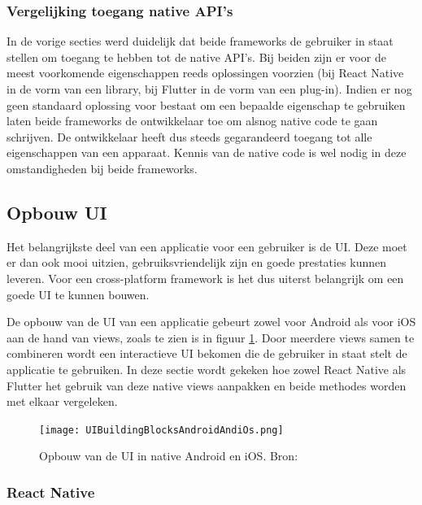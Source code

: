 \subsubsection{Vergelijking toegang native API's}
\label{subsubsec:vglToegangNativeAPIs}

In de vorige secties werd duidelijk dat beide frameworks de gebruiker in staat stellen om toegang te hebben tot de native API's. Bij beiden zijn er voor de meest voorkomende eigenschappen reeds oplossingen voorzien (bij React Native in de vorm van een library, bij Flutter in de vorm van een plug-in). Indien er nog geen standaard oplossing voor bestaat om een bepaalde eigenschap te gebruiken laten beide frameworks de ontwikkelaar toe om alsnog native code te gaan schrijven. De ontwikkelaar heeft dus steeds gegarandeerd toegang tot alle eigenschappen van een apparaat. Kennis van de native code is wel nodig in deze omstandigheden bij beide frameworks.


\subsection{Opbouw UI}
\label{subsec:opbouwUI}

Het belangrijkste deel van een applicatie voor een gebruiker is de UI. Deze moet er dan ook mooi uitzien, gebruiksvriendelijk zijn en goede prestaties kunnen leveren. Voor een cross-platform framework is het dus uiterst belangrijk om een goede UI te kunnen bouwen. 

De opbouw van de UI van een applicatie gebeurt zowel voor Android als voor iOS aan de hand van views, zoals te zien is in figuur \ref{fig:opbouwUIAndroidiOS}. Door meerdere views samen te combineren wordt een interactieve UI bekomen die de gebruiker in staat stelt de applicatie te gebruiken. In deze sectie wordt gekeken hoe zowel React Native als Flutter het gebruik van deze native views aanpakken en beide methodes worden met elkaar vergeleken.

\begin{figure}
\texttt{[image: UIBuildingBlocksAndroidAndiOs.png]}
\caption{Opbouw van de UI in native Android en iOS. Bron:
    \textcite{ReactNative.dev2020}}
\label{fig:opbouwUIAndroidiOS}
\end{figure}

\subsubsection{React Native}
\label{subsubsec:opbouwUIReactNative} 


